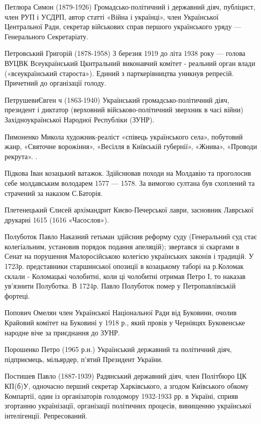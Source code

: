 Петлюра Симон (1879-1926) Громадсько-політичний і державний діяч, публіцист, член РУП і УСДРП, автор статті «Війна і українці», член Української Центральної Ради, секретар військових справ першого українського уряду --- Генерального Секретаріату.

Петровський Григорій (1878-1958)  З березня 1919 до літа 1938 року --- голова ВУЦВК Всеукраїнський Цкнтральний виконавчий комітет - реальний орган влади («всеукраїнський староста»). Единий з парткерівництва уникнув репресій. Причетний до організації голоду.

ПетрушевиЄвген ч (1863-1940) Український громадсько-політичний діяч, президент і диктатор (верховний військово-політичний зверхник в часі війни) Західноукраїнської Народної Республіки (ЗУНР).

Пимоненко Микола художник-реаліст «співець українського села», побутовий жанр, «Святочне ворожіння», «Весілля в Київській губернії», «Жнива», «Проводи рекрута».  . 

Підкова Іван  козацький ватажок. Здійснював походи на Молдавію та проголосив себе молдавським володарем 1577 --- 1578. За вимогою султана був схоплений та страчений за наказом С.Баторія.

Плетенецький  Єлисей архімандрит Києво-Печерської лаври, засновник Лаврської друкарні 1615 (1616 «Часослов»).

Полуботок Павло  Наказний гетьман здійснив реформу суду (Генеральний суд стає колегіальним, установив порядок подання апеляцій); звертався зі скаргами в Сенат на порушення Малоросійською колегією українських законів і традицій. У 1723р. представники старшинської опозиції в козацькому таборі на р.Коломак склали - Коломацькі чолобитні, коли ці чолобитні отримав Петро І, то наказав ув’язнити Полуботка. В 1724р. Павло Полуботок помер у Петропавлівській фортеці.

Попович Омелян член Української Національної Ради від Буковини, очолив Крайовий комітет на Буковині  у 1918 р., який провів у Чернівцях Буковенське народне віче за приєднання до ЗУНР.

Порошенко Петро (1965 р.н.) Український державний та політичний діяч, підприємець, мільярдер, п’ятий Президент України.

Постишев Павло (1887-1939) Радянський державний діяч, член Політбюро ЦК КП(б)У, одночасно перший секретар Харківського, а згодом Київського обкому Компартії, один із організаторів голодомору 1932-1933 рр. в Україні, сприяв згортанню українізації, організації політичних процесів, винищенню української інтелігенції. Репресований.

